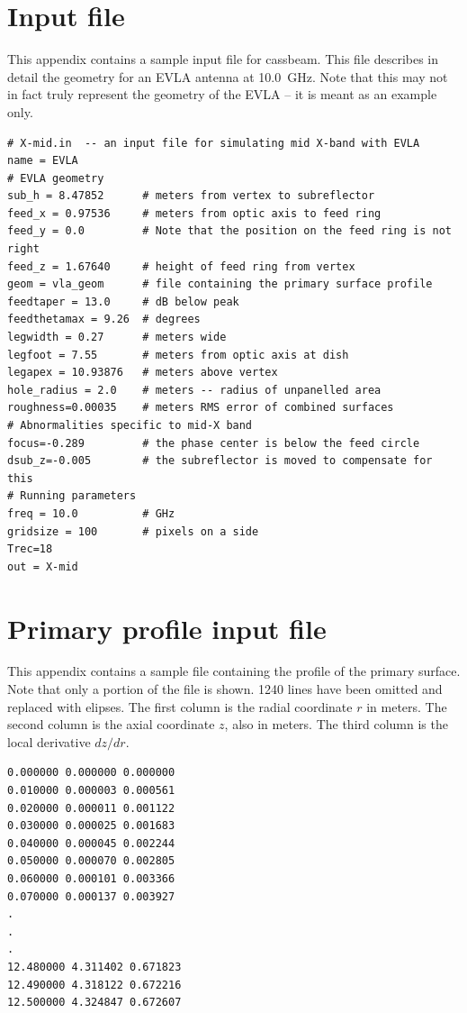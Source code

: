\documentclass{article}
\begin{document}
\appendix
\section{Input file} \label{apx:sample}

This appendix contains a sample input file for cassbeam.  This file
describes in detail the geometry for an EVLA antenna at 10.0~GHz.  Note
that this may not in fact truly represent the geometry of the EVLA -- it 
is meant as an example only.

\begin{verbatim}
# X-mid.in  -- an input file for simulating mid X-band with EVLA
name = EVLA
# EVLA geometry
sub_h = 8.47852      # meters from vertex to subreflector 
feed_x = 0.97536     # meters from optic axis to feed ring 
feed_y = 0.0         # Note that the position on the feed ring is not right
feed_z = 1.67640     # height of feed ring from vertex 
geom = vla_geom      # file containing the primary surface profile
feedtaper = 13.0     # dB below peak
feedthetamax = 9.26  # degrees
legwidth = 0.27      # meters wide
legfoot = 7.55       # meters from optic axis at dish
legapex = 10.93876   # meters above vertex
hole_radius = 2.0    # meters -- radius of unpanelled area
roughness=0.00035    # meters RMS error of combined surfaces
# Abnormalities	specific to mid-X band
focus=-0.289         # the phase center is below the feed circle
dsub_z=-0.005        # the subreflector is moved to compensate for this
# Running parameters
freq = 10.0          # GHz
gridsize = 100       # pixels on a side
Trec=18
out = X-mid
\end{verbatim}

\section{Primary profile input file} \label{apx:vlageom}

This appendix contains a sample file containing the profile of the primary
surface.  Note that only a portion of the file is shown.  1240 lines have been
omitted and replaced with elipses.  The first column is the radial coordinate
$r$ in meters.  The second column is the axial coordinate $z$, also in meters.
The third column is the local derivative $dz/dr$.

\begin{verbatim}
0.000000 0.000000 0.000000
0.010000 0.000003 0.000561
0.020000 0.000011 0.001122
0.030000 0.000025 0.001683
0.040000 0.000045 0.002244
0.050000 0.000070 0.002805
0.060000 0.000101 0.003366
0.070000 0.000137 0.003927
.
.
.
12.480000 4.311402 0.671823
12.490000 4.318122 0.672216
12.500000 4.324847 0.672607
\end{verbatim}
\end{document}
